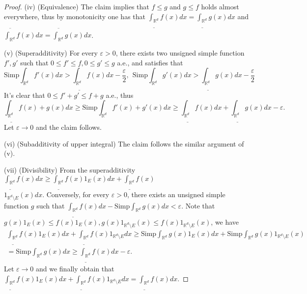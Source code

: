 \documentclass[a4paper]{article}
\begin{document}
\begin{proof}
(iv) (Equivalence) The claim implies that $f \leq g$ and $g \leq f$ holds almost everywhere, thus by monotonicity
one has that $\underline{\int_{\mathbb{R}^d}}f(x) dx = \underline{\int_{\mathbb{R}^d}}g(x) dx$ and
$\overline{\int_{\mathbb{R}^d}}f(x) dx = \overline{\int_{\mathbb{R}^d}}g(x) dx$.

(v) (Superadditivity) For every $\varepsilon > 0$, there exists two unsigned simple function $f', g'$ such that 
$0 \leq f' \leq f, 0 \leq g' \leq g$ a.e., and satisfies that $$
\mathrm{Simp}\int_{\mathbb{R}^d} f'(x)dx > \underline{\int_{\mathbb{R}^d}} f(x)dx - \frac{\varepsilon}{2},\ \ 
\mathrm{Simp}\int_{\mathbb{R}^d} g'(x)dx > \underline{\int_{\mathbb{R}^d}} g(x)dx - \frac{\varepsilon}{2}
$$It's clear that $0 \leq f' + g' \leq f + g$ a.e., thus $$
\underline{\int_{\mathbb{R}^d}} f(x) + g(x) dx \geq \mathrm{Simp}\int_{\mathbb{R}^d} f'(x) + g'(x) dx\geq
\underline{\int_{\mathbb{R}^d}} f(x)dx + \underline{\int_{\mathbb{R}^d}} g(x)dx - \varepsilon.
$$Let $\varepsilon \to 0$ and the claim follows.

(vi) (Subadditivity of upper integral) The claim follows the similar argument of (v).

(vii) (Divisibility) From the superadditivity $\underline{\int_{\mathbb{R}^d}}f(x) dx \geq 
\underline{\int_{\mathbb{R}^d}}f(x)1_{E}(x) dx + \underline{\int_{\mathbb{R}^d}}f(x)$ \\
$1_{\mathbb{R}^d \setminus E}(x) dx$. Conversely, for every $\varepsilon > 0$, there exists an unsigned simple function $g$
such that $\underline{\int_{\mathbb{R}^d}} f(x) dx - \mathrm{Simp}\int_{\mathbb{R}^d} g(x) dx < \varepsilon$.
Note that $g(x)1_E(x) \leq f(x)1_E(x), g(x)1_{\mathbb{R}^d \setminus E}(x) \leq f(x)1_{\mathbb{R}^d \setminus E}(x)$,
we have \begin{multline*}
    \underline{\int_{\mathbb{R}^d}}f(x)1_E(x) dx + \underline{\int_{\mathbb{R}^d}}f(x)1_{\mathbb{R}^d\setminus E} dx
    \geq \mathrm{Simp}\int_{\mathbb{R}^d} g(x)1_E(x) dx + \mathrm{Simp}\int_{\mathbb{R}^d}g(x)1_{\mathbb{R}^d \setminus E}(x)\\
    = \mathrm{Simp}\int_{\mathbb{R}^d} g(x) dx \geq \underline{\int_{\mathbb{R}^d}}f(x) dx - \varepsilon.
\end{multline*}
Let $\varepsilon \to 0$ and we finally obtain that $\underline{\int_{\mathbb{R}^d}}f(x)1_E(x) dx + 
\underline{\int_{\mathbb{R}^d}}f(x)1_{\mathbb{R}^d\setminus E} dx = \underline{\int_{\mathbb{R}^d}}f(x) dx$.


\end{proof}
\end{document}
